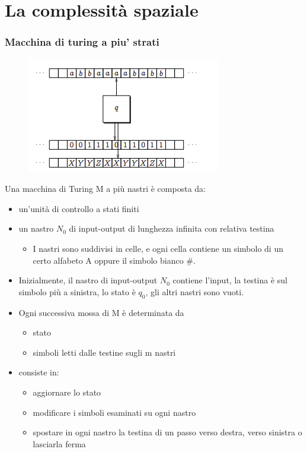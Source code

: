 \chapter{La complessità spaziale} \label{ch:capitolo16}
\subsection{Macchina di turing a piu' strati}
\begin{figure}[htp]
    \centering
    \includegraphics[scale=0.6]{tesi_stile/img/f1cap16.png}
\end{figure}
Una macchina di Turing M a più nastri è composta da:
\begin{itemize}
    \item un’unità di controllo a stati finiti
    \item un nastro $N_0$ di input-output di lunghezza infinita con relativa testina
    \begin{itemize}
        \item I nastri sono suddivisi in celle, e ogni cella contiene un simbolo di un certo alfabeto A oppure il simbolo bianco \#.
    \end{itemize}
    \item Inizialmente, il nastro di input-output $N_0$ contiene l’input, la testina è sul simbolo più a sinistra, lo stato è $q_0$, gli altri nastri sono vuoti.
    \item Ogni successiva mossa di M è determinata da
    \begin{itemize}
        \item stato
        \item simboli letti dalle testine sugli m nastri
    \end{itemize}
    \item consiste in: 
    \begin{itemize}
        \item aggiornare lo stato
        \item modificare i simboli esaminati su ogni nastro
        \item spostare in ogni nastro la testina di un passo verso destra, verso sinistra o lasciarla ferma
    \end{itemize}
\end{itemize}
